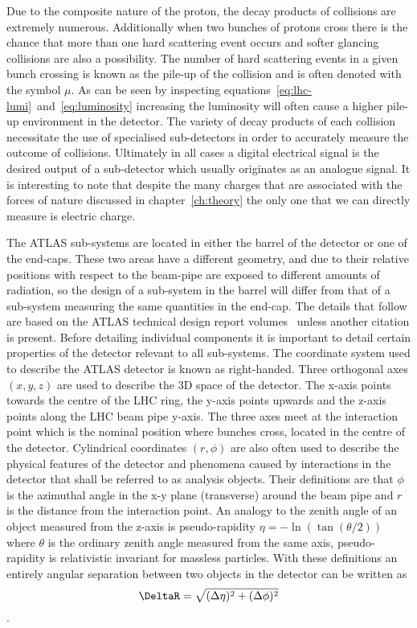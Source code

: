 Due to the composite nature of the proton, the decay products of collisions are
extremely numerous. Additionally when two bunches of protons cross there is the
chance that more than one hard scattering event occurs and softer glancing
collisions are also a possibility. The number of hard scattering events in a
given bunch crossing is known as the pile-up of the collision and is often
denoted with the symbol $\mu$. As can be seen by inspecting
equations~\ref{eq:lhc-lumi}~and~\ref{eq:luminosity} increasing the luminosity
will often cause a higher pile-up environment in the detector. The variety of
decay products of each collision necessitate the use of specialised
sub-detectors in order to accurately measure the outcome of collisions.
Ultimately in all cases a digital electrical signal is the desired output of a
sub-detector which usually originates as an analogue signal. It is interesting
to note that despite the many charges that are associated with the forces of
nature discussed in chapter~\ref{ch:theory} the only one that we can directly
measure is electric charge.

The ATLAS sub-systems are located in either the barrel of the detector or one of
the end-caps. These two areas have a different geometry, and due to their
relative positions with respect to the beam-pipe are exposed to different
amounts of radiation, so the design of a sub-system in the barrel will differ
from that of a sub-system measuring the same quantities in the end-cap. The
details that follow are based on the ATLAS technical design report
volumes~\cite{ATLAS-TDR-01, ATLAS-TDR-02} unless another citation is present.
Before detailing individual components it is important to detail certain
properties of the detector relevant to all sub-systems.  The coordinate system
used to describe the ATLAS detector is known as right-handed. Three orthogonal
axes $(x, y, z)$ are used to describe the 3D space of the detector. The x-axis
points towards the centre of the LHC ring, the y-axis points upwards and the
z-axis points along the LHC beam pipe y-axis. The three axes meet at the
interaction point which is the nominal position where bunches cross, located in
the centre of the detector. Cylindrical coordinates $(r, \phi)$ are also often
used to describe the physical features of the detector and phenomena caused by
interactions in the detector that shall be referred to as analysis objects.
Their definitions are that $\phi$ is the azimuthal angle in the x-y plane
(transverse) around the beam pipe and $r$ is the distance from the interaction
point. An analogy to the zenith angle of an object measured from the z-axis is
pseudo-rapidity $\eta = - \ln(\tan(\theta / 2))$ where $\theta$ is the ordinary
zenith angle measured from the same axis, pseudo-rapidity is relativistic
invariant for massless particles. With these definitions an entirely angular
separation between two objects in the detector can be written as
\begin{equation}
  \DeltaR = \sqrt{(\Delta\eta)^2 + (\Delta\phi)^2}
\end{equation}.

